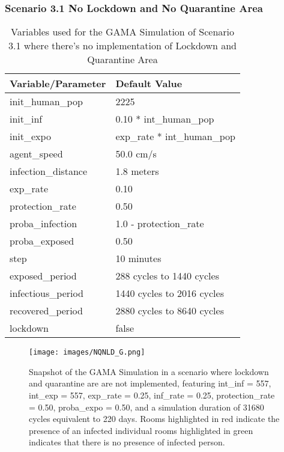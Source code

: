 	\subsubsection{ Scenario 3.1 No Lockdown and No Quarantine Area}
	\label{S3.1}

	\begin{table}[H]
		\centering
		\begin{tabular}{ll}
			\toprule
			\textbf{Variable/}\textbf{Parameter} & \textbf{Default Value}\\
			\hline
			init\_human\_pop & 2225\\
			init\_inf & 0.10 * int\_human\_pop\\
			init\_expo & exp\_rate * int\_human\_pop \\
			agent\_speed & 50.0 cm/s\\
			infection\_distance & 1.8 meters\\
			exp\_rate & 0.10\\
			protection\_rate & 0.50\\
			proba\_infection & 1.0 - protection\_rate\\
			proba\_exposed & 0.50\\
			step & 10 minutes\\
			exposed\_period & 288 cycles to 1440 cycles\\
			infectious\_period & 1440 cycles to 2016 cycles\\
			recovered\_period & 2880 cycles to 8640 cycles\\ 
			lockdown & false\\
			\bottomrule
		\end{tabular}
		\caption{Variables used for the GAMA Simulation of Scenario 3.1 where there's no implementation of Lockdown and Quarantine Area}
		\label{3.1}
	\end{table}
		\begin{figure}[H]
		\centering
		\texttt{[image: images/NQNLD\_G.png]}
		\caption{Snapshot of the GAMA Simulation in a scenario where lockdown and quarantine are are not implemented, featuring int\_inf = 557, int\_exp = 557, exp\_rate = 0.25, inf\_rate = 0.25, protection\_rate = 0.50, proba\_expo = 0.50, and a simulation duration of 31680 cycles equivalent to 220 days. Rooms highlighted in red indicate the presence of an infected individual rooms highlighted in green indicates that there is no presence of infected person.}
		\label{ER5G}
	\end{figure}
